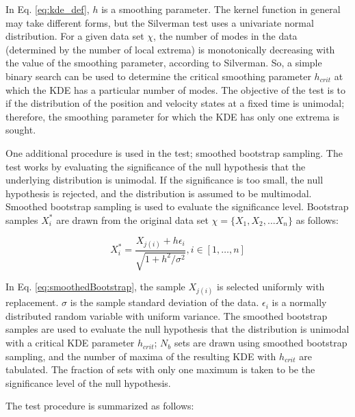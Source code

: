 \documentclass[]{article}
\begin{document}
In Eq. \ref{eq:kde_def}, $h$ is a smoothing parameter. The kernel function in general may take different forms, but the Silverman test uses a univariate normal distribution. For a given data set $\chi$, the number of modes in the data (determined by the number of local extrema) is monotonically decreasing with the value of the smoothing parameter, according to Silverman\cite{silverman}. So, a simple binary search can be used to determine the critical smoothing parameter $h_{crit}$ at which the KDE has a particular number of modes. The objective of the test is to if the distribution of the position and velocity states at a fixed time is unimodal; therefore, the smoothing parameter for which the KDE has only one extrema is sought.

One additional procedure is used in the test; smoothed bootstrap sampling. The test works by evaluating the significance of the null hypothesis that the underlying distribution is unimodal. If the significance is too small, the null hypothesis is rejected, and the distribution is assumed to be multimodal. Smoothed bootstrap sampling is used to evaluate the significance level. Bootstrap samples $X_i^*$ are drawn from the original data set $\chi = \{ X_1,X_2,...X_n \}$ as follows:

\begin{equation}
X_i^* = \frac{X_{j(i)} + h\epsilon_i}{\sqrt{1+h^2/\sigma^2}}, i \in [1,\dots,n]
\label{eq:smoothedBootstrap}
\end{equation}

In Eq. \ref{eq:smoothedBootstrap}, the sample $X_{j(i)}$ is selected uniformly with replacement. $\sigma$ is the sample standard deviation of the data. $\epsilon_i$ is a normally distributed random variable with uniform variance. The smoothed bootstrap samples are used to evaluate the null hypothesis that the distribution is unimodal with a critical KDE parameter $h_{crit}$; $N_b$ sets are drawn using smoothed bootstrap sampling, and the number of maxima of the resulting KDE with $h_{crit}$ are tabulated. The fraction of sets with only one maximum is taken to be the significance level of the null hypothesis.

The test procedure is summarized as follows:
\end{document}
